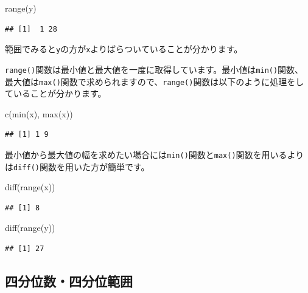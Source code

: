 \documentclass[
  12pt,
]{book}
\newenvironment{Shaded}{\begin{snugshade}}{\end{snugshade}}
\newcommand{\FunctionTok}[1]{\textcolor[rgb]{0.00,0.00,0.00}{#1}}
\newcommand{\NormalTok}[1]{#1}
\begin{document}
\begin{Shaded}
\begin{Highlighting}[numbers=left,,]
\FunctionTok{range}\NormalTok{(y)}
\end{Highlighting}
\end{Shaded}

\begin{verbatim}
## [1]  1 28
\end{verbatim}

範囲でみると\texttt{y}の方が\texttt{x}よりばらついていることが分かります。

\texttt{range()}関数は最小値と最大値を一度に取得しています。最小値は\texttt{min()}関数、最大値は\texttt{max()}関数で求められますので、\texttt{range()}関数は以下のように処理をしていることが分かります。

\begin{Shaded}
\begin{Highlighting}[numbers=left,,]
\FunctionTok{c}\NormalTok{(}\FunctionTok{min}\NormalTok{(x), }\FunctionTok{max}\NormalTok{(x))}
\end{Highlighting}
\end{Shaded}

\begin{verbatim}
## [1] 1 9
\end{verbatim}

最小値から最大値の幅を求めたい場合には\texttt{min()}関数と\texttt{max()}関数を用いるよりは\texttt{diff()}関数を用いた方が簡単です。

\begin{Shaded}
\begin{Highlighting}[numbers=left,,]
\FunctionTok{diff}\NormalTok{(}\FunctionTok{range}\NormalTok{(x))}
\end{Highlighting}
\end{Shaded}

\begin{verbatim}
## [1] 8
\end{verbatim}

\begin{Shaded}
\begin{Highlighting}[numbers=left,,]
\FunctionTok{diff}\NormalTok{(}\FunctionTok{range}\NormalTok{(y))}
\end{Highlighting}
\end{Shaded}

\begin{verbatim}
## [1] 27
\end{verbatim}

\hypertarget{ux56dbux5206ux4f4dux6570ux56dbux5206ux4f4dux7bc4ux56f2}{%
\subsection{四分位数・四分位範囲}\label{ux56dbux5206ux4f4dux6570ux56dbux5206ux4f4dux7bc4ux56f2}}
\end{document}
